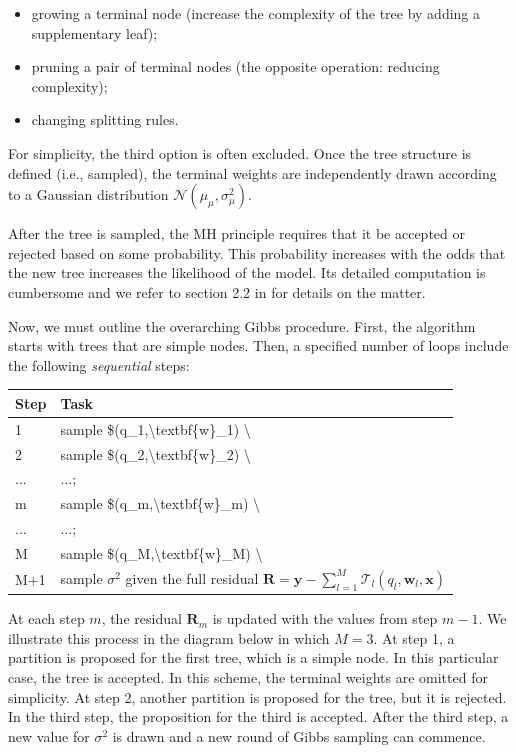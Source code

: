 \begin{itemize}
\item growing a terminal node (increase the complexity of the tree by adding a supplementary leaf);
\item pruning a pair of terminal nodes (the opposite operation: reducing complexity);
\item changing splitting rules.
\end{itemize}

For simplicity, the third option is often excluded. Once the tree structure is defined (i.e., sampled), the terminal weights are independently drawn according to a Gaussian distribution $\mathcal{N}(\mu_\mu, \sigma_\mu^2)$.

After the tree is sampled, the MH principle requires that it be accepted or rejected based on some probability. This probability increases with the odds that the new tree increases the likelihood of the model. Its detailed computation is cumbersome and we refer to section 2.2 in \cite{sparapani2019r} for details on the matter.

Now, we must outline the overarching Gibbs procedure. First, the algorithm starts with trees that are simple nodes. Then, a specified number of loops include the following \textit{sequential} steps:

\bigskip\noindent
\begin{tabular}{p{}p{}}
\toprule
Step & Task \\
\hline
1 & sample \$(q\_1,{\textbackslash}textbf\{w\}\_1) {\textbackslash} \\
2 & sample \$(q\_2,{\textbackslash}textbf\{w\}\_2) {\textbackslash} \\
... & ...; \\
m & sample \$(q\_m,{\textbackslash}textbf\{w\}\_m) {\textbackslash} \\
... & ...; \\
M & sample \$(q\_M,{\textbackslash}textbf\{w\}\_M) {\textbackslash} \\
M+1 & sample $\sigma^2$ given the full residual $\textbf{R}=\textbf{y} -\sum_{l=1}^M\mathcal{T}_l(q_l,\textbf{w}_l, \textbf{x})$ \\
\bottomrule
\end{tabular}

\bigskip

At each step $m$, the residual $\textbf{R}_{m}$ is updated with the values from step $m -1$. We illustrate this process in the diagram below in which $M=3$. At step 1, a partition is proposed for the first tree, which is a simple node. In this particular case, the tree is accepted. In this scheme, the terminal weights are omitted for simplicity. At step 2, another partition is proposed for the tree, but it is rejected. In the third step, the proposition for the third is accepted. After the third step, a new value for $\sigma^2$ is drawn and a new round of Gibbs sampling can commence.

